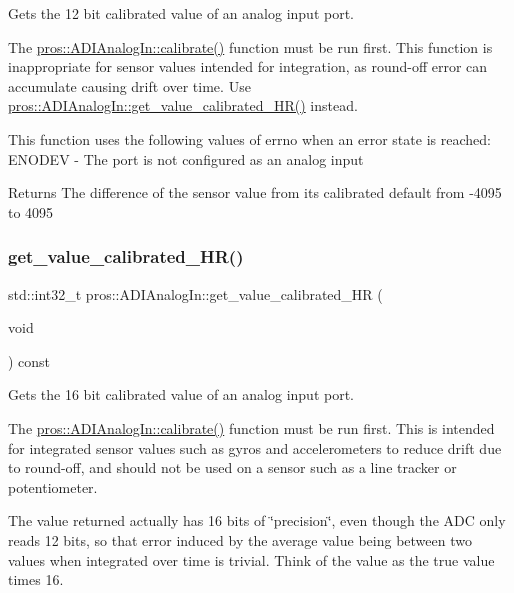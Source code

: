 Gets the 12 bit calibrated value of an analog input port. 

The \hyperlink{classpros_1_1ADIAnalogIn_ac8dd1e625cbcec4951d20be0c0fa2d3c}{pros\+::\+A\+D\+I\+Analog\+In\+::calibrate()} function must be run first. This function is inappropriate for sensor values intended for integration, as round-\/off error can accumulate causing drift over time. Use \hyperlink{classpros_1_1ADIAnalogIn_a65bfed175ed1b0efce4566e78e7f9473}{pros\+::\+A\+D\+I\+Analog\+In\+::get\+\_\+value\+\_\+calibrated\+\_\+\+H\+R()} instead.

This function uses the following values of errno when an error state is reached\+: E\+N\+O\+D\+EV -\/ The port is not configured as an analog input

\begin{DoxyReturn}{Returns}
The difference of the sensor value from its calibrated default from -\/4095 to 4095 
\end{DoxyReturn}
\mbox{\label{classpros_1_1ADIAnalogIn_a65bfed175ed1b0efce4566e78e7f9473}} 
\subsubsection{\texorpdfstring{get\+\_\+value\+\_\+calibrated\+\_\+\+H\+R()}{get\_value\_calibrated\_HR()}}
{\footnotesize\ttfamily std\+::int32\+\_\+t pros\+::\+A\+D\+I\+Analog\+In\+::get\+\_\+value\+\_\+calibrated\+\_\+\+HR (\begin{DoxyParamCaption}\item[{void}]{ }\end{DoxyParamCaption}) const}



Gets the 16 bit calibrated value of an analog input port. 

The \hyperlink{classpros_1_1ADIAnalogIn_ac8dd1e625cbcec4951d20be0c0fa2d3c}{pros\+::\+A\+D\+I\+Analog\+In\+::calibrate()} function must be run first. This is intended for integrated sensor values such as gyros and accelerometers to reduce drift due to round-\/off, and should not be used on a sensor such as a line tracker or potentiometer.

The value returned actually has 16 bits of \char`\"{}precision\char`\"{}, even though the A\+DC only reads 12 bits, so that error induced by the average value being between two values when integrated over time is trivial. Think of the value as the true value times 16.

